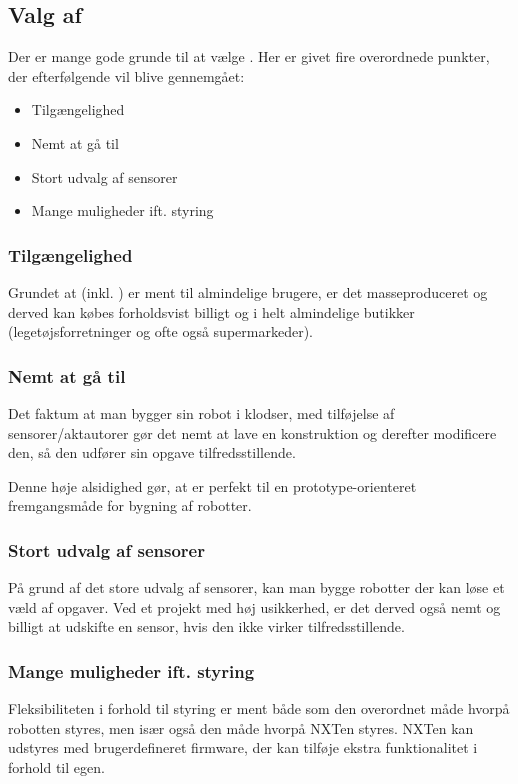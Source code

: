 \subsection{Valg af \legoms}
Der er mange gode grunde til at vælge \legoms.
Her er givet fire overordnede punkter, der efterfølgende vil blive gennemgået:

\begin{itemize}
\item{Tilgængelighed}
\item{Nemt at gå til}
\item{Stort udvalg af sensorer}
\item{Mange muligheder ift. styring}
\end{itemize}

\subsubsection{Tilgængelighed}
Grundet at \lego (inkl. \legoms) er ment til almindelige brugere, er det masseproduceret og derved kan købes forholdsvist billigt og i helt almindelige butikker (legetøjsforretninger og ofte også supermarkeder).

\subsubsection{Nemt at gå til}
Det faktum at man bygger sin robot i \lego klodser, med tilføjelse af \legoms sensorer/aktautorer gør det nemt at lave en konstruktion og derefter modificere den, så den udfører sin opgave tilfredsstillende.

Denne høje alsidighed gør, at \lego er perfekt til en prototype-orienteret fremgangsmåde for bygning af robotter.

\subsubsection{Stort udvalg af sensorer}
På grund af det store udvalg af sensorer, kan man bygge robotter der kan løse et væld af opgaver.
Ved et projekt med høj usikkerhed, er det derved også nemt og billigt at udskifte en sensor, hvis den ikke virker tilfredsstillende.

\subsubsection{Mange muligheder ift. styring}
Fleksibiliteten i forhold til styring er ment både som den overordnet  måde hvorpå robotten styres, men især også den måde hvorpå NXTen styres.
NXTen kan udstyres med brugerdefineret firmware, der kan tilføje ekstra funktionalitet i forhold til \legos egen.

